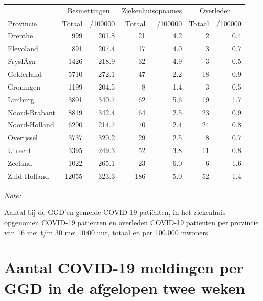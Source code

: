 \documentclass[
  english,
  man,floatsintext]{apa6}
\begin{document}
\begin{table}
\centering
\begin{threeparttable}
\begin{tabular}{lrrrrrr}
\toprule
\multicolumn{1}{c}{ } & \multicolumn{2}{c}{Besmettingen} & \multicolumn{2}{c}{Ziekenhuisopnames} & \multicolumn{2}{c}{Overleden} \\
\cmidrule(l{3pt}r{3pt}){2-3} \cmidrule(l{3pt}r{3pt}){4-5} \cmidrule(l{3pt}r{3pt}){6-7}
Provincie & Totaal & /100000 & Totaal & /100000 & Totaal & /100000\\
\midrule
Drenthe & 999 & 201.8 & 21 & 4.2 & 2 & 0.4\\
Flevoland & 891 & 207.4 & 17 & 4.0 & 3 & 0.7\\
FryslÃ¢n & 1426 & 218.9 & 32 & 4.9 & 3 & 0.5\\
Gelderland & 5710 & 272.1 & 47 & 2.2 & 18 & 0.9\\
Groningen & 1199 & 204.5 & 8 & 1.4 & 3 & 0.5\\
Limburg & 3801 & 340.7 & 62 & 5.6 & 19 & 1.7\\
Noord-Brabant & 8819 & 342.4 & 64 & 2.5 & 23 & 0.9\\
Noord-Holland & 6200 & 214.7 & 70 & 2.4 & 24 & 0.8\\
Overijssel & 3737 & 320.2 & 29 & 2.5 & 8 & 0.7\\
Utrecht & 3395 & 249.3 & 52 & 3.8 & 11 & 0.8\\
Zeeland & 1022 & 265.1 & 23 & 6.0 & 6 & 1.6\\
Zuid-Holland & 12055 & 323.3 & 186 & 5.0 & 52 & 1.4\\
\bottomrule
\end{tabular}
\begin{tablenotes}
\item \textit{Note: } 
\item Aantal bij de GGD’en gemelde COVID-19 patiënten, in het ziekenhuis opgenomen COVID-19 patiënten en overleden COVID-19 patiënten per provincie van 16 mei t/m 30 mei 10:00 uur, totaal en per 100.000 inwoners
\end{tablenotes}
\end{threeparttable}
\end{table}

\newpage

\hypertarget{aantal-covid-19-meldingen-per-ggd-in-de-afgelopen-twee-weken}{%
\section{Aantal COVID-19 meldingen per GGD in de afgelopen twee weken}\label{aantal-covid-19-meldingen-per-ggd-in-de-afgelopen-twee-weken}}
\end{document}
